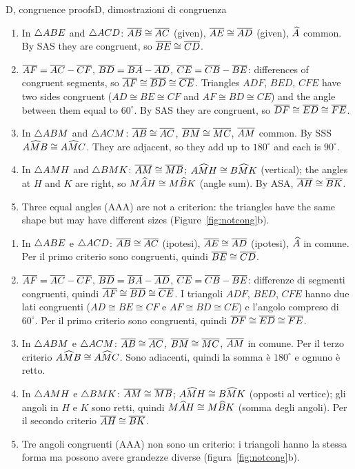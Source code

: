 \begin{solution}{D, congruence proofs}{D, dimostrazioni di congruenza}
\begin{enumerate}[label=\textbf{D\arabic*.}, leftmargin=2.2em]
\item In $\triangle ABE$ and $\triangle ACD$: $\overline{AB} \cong \overline{AC}$ (given), $\overline{AE} \cong \overline{AD}$ (given), $\widehat{A}$ common. By SAS they are congruent, so $\overline{BE} \cong \overline{CD}$.
\item $\overline{AF} = \overline{AC} - \overline{CF}$, $\overline{BD} = \overline{BA} - \overline{AD}$, $\overline{CE} = \overline{CB} - \overline{BE}$: differences of congruent segments, so $\overline{AF} \cong \overline{BD} \cong \overline{CE}$. Triangles $ADF$, $BED$, $CFE$ have two sides congruent ($AD \cong BE \cong CF$ and $AF \cong BD \cong CE$) and the angle between them equal to $60^\circ$. By SAS they are congruent, so $\overline{DF} \cong \overline{ED} \cong \overline{FE}$.
\item In $\triangle ABM$ and $\triangle ACM$: $\overline{AB} \cong \overline{AC}$, $\overline{BM} \cong \overline{MC}$, $\overline{AM}$ common. By SSS $A\widehat{M}B \cong A\widehat{M}C$. They are adjacent, so they add up to $180^\circ$ and each is $90^\circ$.
\item In $\triangle AMH$ and $\triangle BMK$: $\overline{AM} \cong \overline{MB}$; $A\widehat{M}H \cong B\widehat{M}K$ (vertical); the angles at $H$ and $K$ are right, so $M\widehat{A}H \cong M\widehat{B}K$ (angle sum). By ASA, $\overline{AH} \cong \overline{BK}$.
\item Three equal angles (AAA) are not a criterion: the triangles have the same shape but may have different sizes (Figure~\ref{fig:notcong}b).
\end{enumerate}
\tcblower
\begin{enumerate}[label=\textbf{D\arabic*.}, leftmargin=2.2em]
\item In $\triangle ABE$ e $\triangle ACD$: $\overline{AB} \cong \overline{AC}$ (ipotesi), $\overline{AE} \cong \overline{AD}$ (ipotesi), $\widehat{A}$ in comune. Per il primo criterio sono congruenti, quindi $\overline{BE} \cong \overline{CD}$.
\item $\overline{AF} = \overline{AC} - \overline{CF}$, $\overline{BD} = \overline{BA} - \overline{AD}$, $\overline{CE} = \overline{CB} - \overline{BE}$: differenze di segmenti congruenti, quindi $\overline{AF} \cong \overline{BD} \cong \overline{CE}$. I triangoli $ADF$, $BED$, $CFE$ hanno due lati congruenti ($AD \cong BE \cong CF$ e $AF \cong BD \cong CE$) e l'angolo compreso di $60^\circ$. Per il primo criterio sono congruenti, quindi $\overline{DF} \cong \overline{ED} \cong \overline{FE}$.
\item In $\triangle ABM$ e $\triangle ACM$: $\overline{AB} \cong \overline{AC}$, $\overline{BM} \cong \overline{MC}$, $\overline{AM}$ in comune. Per il terzo criterio $A\widehat{M}B \cong A\widehat{M}C$. Sono adiacenti, quindi la somma è $180^\circ$ e ognuno è retto.
\item In $\triangle AMH$ e $\triangle BMK$: $\overline{AM} \cong \overline{MB}$; $A\widehat{M}H \cong B\widehat{M}K$ (opposti al vertice); gli angoli in $H$ e $K$ sono retti, quindi $M\widehat{A}H \cong M\widehat{B}K$ (somma degli angoli). Per il secondo criterio $\overline{AH} \cong \overline{BK}$.
\item Tre angoli congruenti (AAA) non sono un criterio: i triangoli hanno la stessa forma ma possono avere grandezze diverse (figura~\ref{fig:notcong}b).
\end{enumerate}
\end{solution}
